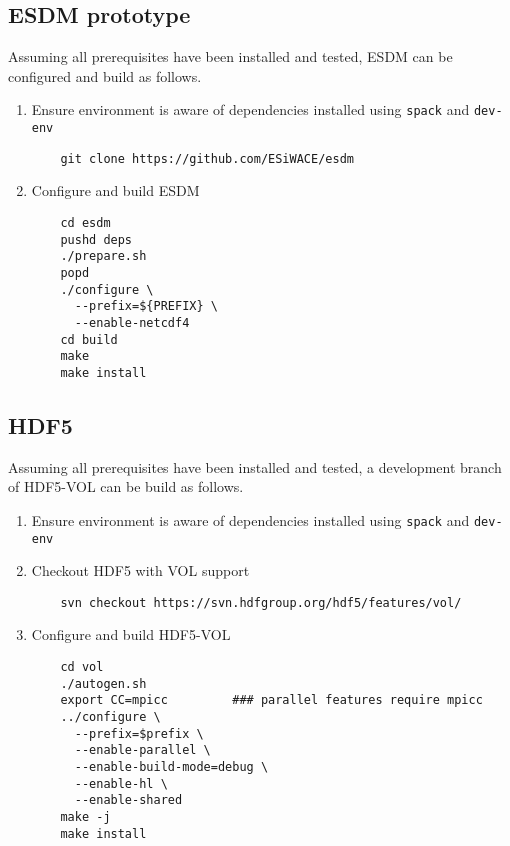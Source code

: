 \subsection{ESDM prototype}
Assuming all prerequisites have been installed and tested, ESDM can be configured and build as follows.
\begin{enumerate}
  \item Ensure environment is aware of dependencies installed using \lstinline|spack| and \lstinline|dev-env|
    \begin{lstlisting}
    git clone https://github.com/ESiWACE/esdm
    \end{lstlisting}
  \item Configure and build ESDM
    \begin{lstlisting}
    cd esdm
    pushd deps
    ./prepare.sh
    popd
    ./configure \
      --prefix=${PREFIX} \
      --enable-netcdf4
    cd build
    make
    make install
    \end{lstlisting}
\end{enumerate}

\subsection{HDF5}%
\label{hdf5}
Assuming all prerequisites have been installed and tested, a development branch of HDF5-VOL can be build as follows.
\begin{enumerate}
  \item Ensure environment is aware of dependencies installed using \lstinline|spack| and \lstinline|dev-env|
  \item Checkout HDF5 with VOL support
    \begin{lstlisting}
    svn checkout https://svn.hdfgroup.org/hdf5/features/vol/
    \end{lstlisting}
  \item Configure and build HDF5-VOL
    \begin{lstlisting}
    cd vol
    ./autogen.sh
    export CC=mpicc         ### parallel features require mpicc
    ../configure \
      --prefix=$prefix \
      --enable-parallel \
      --enable-build-mode=debug \
      --enable-hl \
      --enable-shared
    make -j
    make install
    \end{lstlisting}
\end{enumerate}

